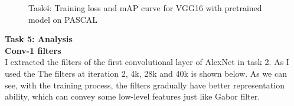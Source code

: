 \documentclass[12pt]{report}
\begin{document}
\begin{outline}
\begin{figure}[!h]
  \centering
  \caption{Task4: Training loss and mAP curve for VGG16 with pretrained model on PASCAL}
\label{fig:short}
\end{figure}

\item \textbf{Task 5: Analysis}\\

\textbf{Conv-1 filters}\\

I extracted the filters of the first convolutional layer of AlexNet in task 2. As I used the The filters at iteration 2, 4k, 28k and 40k is shown below. As we can see, with the training process, the filters gradually have better representation ability, which can convey some low-level features just like Gabor filter.\\


\end{outline}
\end{document}
